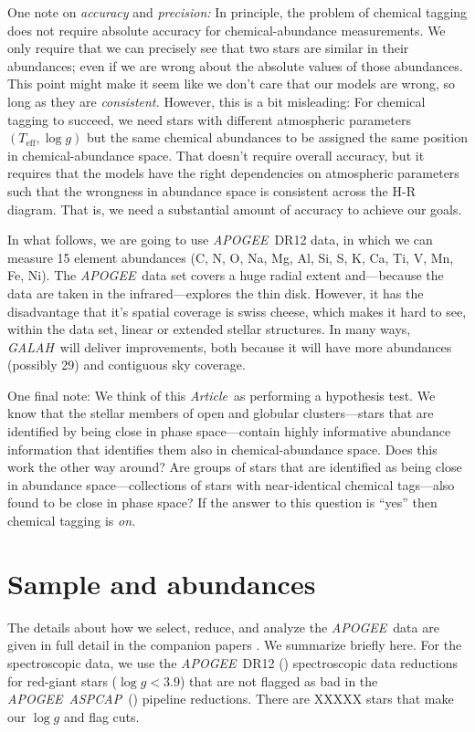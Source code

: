\documentclass[12pt, letterpaper, preprint]{aastex}
\newcommand{\acronym}[1]{{\small{#1}}}
\newcommand{\project}[1]{\textsl{#1}}
\newcommand{\apogee}{\project{\acronym{APOGEE}}}
\newcommand{\aspcap}{\project{\acronym{ASPCAP}}}
\newcommand{\galah}{\project{\acronym{GALAH}}}
\newcommand{\documentname}{\textsl{Article}}
\newcommand{\teff}{T_{\mathrm{eff}}}
\newcommand{\logg}{\log g}
\begin{document}
One note on \emph{accuracy} and \emph{precision:}
In principle, the problem of chemical tagging does not require
absolute accuracy for chemical-abundance measurements.
We only require that we can precisely see that two stars are similar
in their abundances; even if we are wrong about the absolute values of
those abundances.
This point might make it seem like we don't care that our models are
wrong, so long as they are \emph{consistent.}
However, this is a bit misleading:
For chemical tagging to succeed, we need stars with different
atmospheric parameters $(\teff, \logg)$ but the same chemical
abundances to be assigned the same position in chemical-abundance
space.
That doesn't require overall accuracy, but it requires that the models
have the right dependencies on atmospheric parameters such that the
wrongness in abundance space is consistent across the H-R diagram.
That is, we need a substantial amount of accuracy to achieve our goals.

In what follows, we are going to use \apogee\ \acronym{DR12} data, in
which we can measure 15 element abundances (C, N, O, Na, Mg, Al, Si,
S, K, Ca, Ti, V, Mn, Fe, Ni).
The \apogee\ data set covers a huge radial extent and---because the
data are taken in the infrared---explores the thin disk.
However, it has the disadvantage that it's spatial coverage is swiss
cheese, which makes it hard to see, within the data set, linear or
extended stellar structures.
In many ways, \galah\ will deliver improvements, both because it will
have more abundances (possibly 29) and contiguous sky coverage.

One final note:
We think of this \documentname\ as performing a hypothesis test.
We know that the stellar members of open and globular clusters---stars
that are identified by being close in phase space---contain highly
informative abundance information that identifies them also in
chemical-abundance space.
Does this work the other way around?
Are groups of stars that are identified as being close in abundance
space---collections of stars with near-identical chemical tags---also
found to be close in phase space?
If the answer to this question is ``yes'' then chemical tagging is
\emph{on.}

\clearpage
\section{Sample and abundances}

The details about how we select, reduce, and analyze the \apogee\ data
are given in full detail in the companion papers \citep{casey16, ness16}.
We summarize briefly here.
For the spectroscopic data, we use the \apogee\ \acronym{DR12}
(\cite{dr12}) spectroscopic data reductions for red-giant stars
($\logg < 3.9$) that are not flagged as bad in the
\apogee\ \aspcap\ (\cite{aspcap}) pipeline reductions.
There are XXXXX stars that make our $\logg$ and flag cuts.
\end{document}
